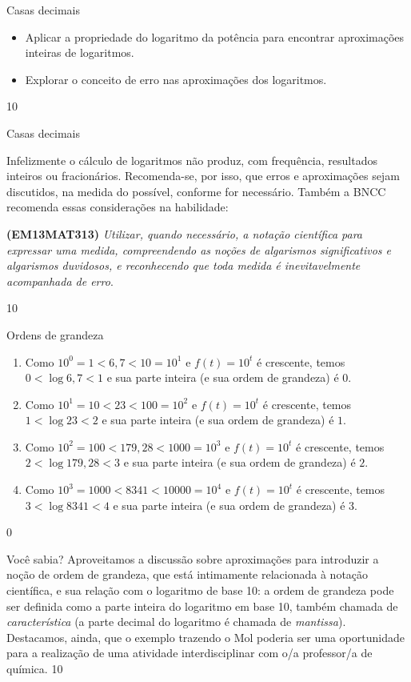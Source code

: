 \clearmargin
\begin{objectives}{Casas decimais}
{
	\begin{itemize}
	\item Aplicar a propriedade do logaritmo da potência para encontrar aproximações inteiras de logaritmos.
	\item Explorar o conceito de erro nas aproximações dos logaritmos.
	\end{itemize}
}{1}{0}
\end{objectives}
\begin{sugestions}{Casas decimais}
{
	Infelizmente o cálculo de logaritmos não produz, com frequência, resultados inteiros ou fracionários. Recomenda-se, por isso, que erros e aproximações sejam discutidos, na medida do possível, conforme for necessário. Também a BNCC recomenda essas considerações na habilidade:

	\textbf{(EM13MAT313)} \textit{Utilizar, quando necessário, a notação científica para expressar uma medida, compreendendo as noções de algarismos significativos e algarismos duvidosos, e reconhecendo que toda medida é inevitavelmente acompanhada de erro}.
}{1}{0}
\end{sugestions}
\begin{answer}{Ordens de grandeza}
{
	\begin{enumerate}
	\item Como $10^0=1 < 6{,}7 <10 =10^1$ e $f(t)=10^t$ é crescente, temos $0 < \log 6{,}7 < 1$ e sua parte inteira (e sua ordem de grandeza) é $0$.
	\item Como $10^1=10 < 23 <100 =10^2$ e $f(t)=10^t$ é crescente, temos $1 < \log 23 < 2$ e sua parte inteira (e sua ordem de grandeza) é $1$.
	\item Como $10^2=100 < 179{,}28 <1000 =10^3$ e $f(t)=10^t$ é crescente, temos $2 < \log 179{,}28 < 3$ e sua parte inteira (e sua ordem de grandeza) é $2$.
	\item Como $10^3=1000 < 8341 <10000 =10^4$ e $f(t)=10^t$ é crescente, temos $3 < \log 8341 < 4$ e sua parte inteira (e sua ordem de grandeza) é $3$.
	\end{enumerate}
	}{0}
\end{answer}
\begin{sugestions}{Você sabia?}
{
	Aproveitamos a discussão sobre aproximações para introduzir a noção de ordem de grandeza, que está intimamente relacionada à notação científica, e sua relação com o logaritmo de base 10: a ordem de grandeza pode ser definida como a parte inteira do logaritmo em base 10, também chamada de \textit{característica} (a parte decimal do logaritmo é chamada de \textit{mantissa}). Destacamos, ainda, que o exemplo trazendo o Mol poderia ser uma oportunidade para a realização de uma atividade interdisciplinar com o/a professor/a de química.
}{1}{0}
\end{sugestions}
